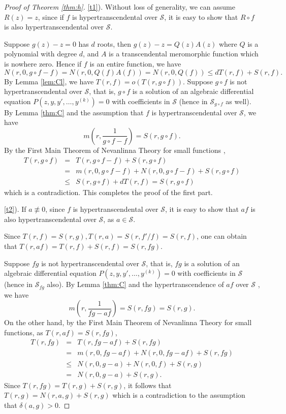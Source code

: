 \documentclass[reqno,12pt]{amsart}
\begin{document}
\begin{proof}[Proof of Theorem \ref{thm:h}]
 \ref{t1}). Without loss of generality, we can assume $R(z)=z$, since if $f$ is hypertranscendental over $\mathcal{S}$, it is easy to show that $R\circ f$ is also hypertranscendental over $\mathcal{S}$. 

Suppose $g(z)-z=0$ has $d$ roots, then $g(z)-z=Q(z)A(z)$ where $Q$ is a polynomial with degree $d$, and $A$ is a transcendental meromorphic function which is nowhere zero. Hence 
 if $f$ is an entire function, we have  $$N(r, 0, g\circ f- f)=N(r, 0, Q(f)A(f))=N(r, 0, Q(f))\leq dT(r, f)+S(r, f).$$
By  Lemma \ref{lem:Cl}, we have $T(r, f)=o(T(r, g\circ f))$. Suppose $g\circ f$ is not hypertranscendental over $\mathcal{S}$, that is, $g\circ f$ is a solution of an algebraic differential equation $P(z, y, y', \dots, y^{(k)})=0$ with coefficients in $\mathcal{S}$ (hence in $\mathcal{S}_{g\circ f}$ as well). 
 By Lemma \ref{thm:C} and the assumption that $f$ is hypertranscendental over $\mathcal{S}$, we have $$m\left(r, \dfrac{1}{g\circ f- f}\right)=S(r, g\circ f).$$ 
By the First Main Theorem of Nevanlinna Theory for small functions \cite{Mohon82},
\begin{eqnarray*}
T(r, g\circ f)&=&T(r, g\circ f-f)+S(r, g\circ f)\\
&=&m(r, 0, g\circ f-f)+N(r, 0, g\circ f- f)+S(r, g\circ f)\\
&\leq& S(r, g\circ f)+dT(r, f)=S(r, g\circ f)
\end{eqnarray*} which is a contradiction. This completes the proof of the first part. 
 
 \ref{t2}). If $a\not\equiv 0$, since $f$ is hypertranscendental over $\mathcal{S}$, it is easy to show that $af$ is also hypertranscendental over $\mathcal{S}$, as $a\in\mathcal{S}$.
 
Since $T(r, f)=S(r, g), T(r, a)=S(r, f'/f)=S(r, f)$, one can obtain that $T(r, af)=T(r, f)+S(r, f)=S(r, fg).$

Suppose $fg$ is not hypertranscendental over $\mathcal{S}$, that is, $fg$ is a solution of an algebraic differential equation $P(z, y, y', \dots, y^{(k)})=0$ with coefficients in $\mathcal{S}$ (hence in $\mathcal{S}_{fg}$ also). By Lemma \ref{thm:C} and the hypertranscendence of $af$ over $\mathcal{S}$ , we have $$m\left(r, \dfrac{1}{fg-af}\right)=S(r, fg)=S(r, g).$$ 
On the other hand, by the First Main Theorem of Nevanlinna Theory for small functions, as $T(r, af)=S(r, fg)$,
 \begin{eqnarray*}
T(r, fg)&=&T(r, fg-af)+S(r, fg)\\
&=&m(r, 0, fg-af)+N(r, 0, fg - af)+S(r, fg)\\
&\leq& N(r, 0, g-a)+N(r, 0, f)+S(r, g)\\
&=& N(r, 0, g-a)+S(r, g). 
\end{eqnarray*} Since $T(r, fg)=T(r, g)+S(r, g)$, it follows that $T(r, g)=N(r, a, g)+S(r, g)$ which is a contradiction to the assumption that $\delta(a, g)>0$.
 

\end{proof}
\end{document}
